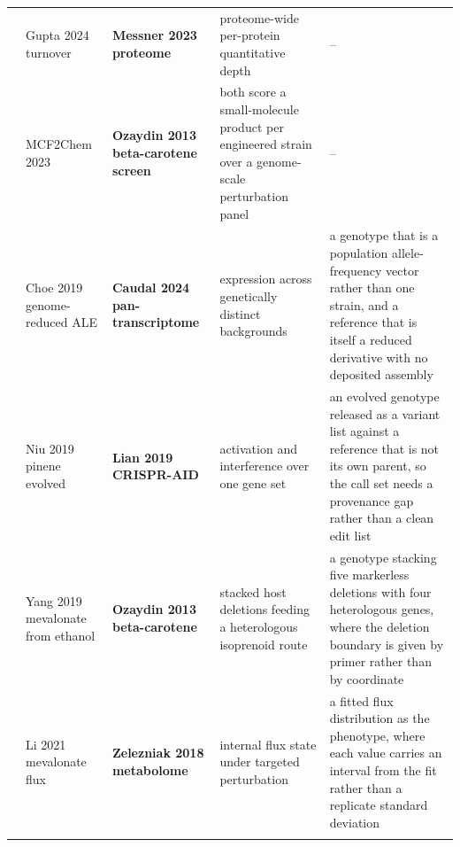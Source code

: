 \begin{landscape}
\begin{longtable}{@{}r@{\hspace{4pt}} L{40mm} L{40mm} L{74mm} L{74mm}@{}}
 & Gupta 2024 turnover  & \textbf{Messner 2023 proteome} & proteome-wide per-protein quantitative depth & -- \\
 & MCF2Chem 2023  & \textbf{Ozaydin 2013 beta-carotene screen} & both score a small-molecule product per engineered strain over a genome-scale perturbation panel & -- \\
 & Choe 2019 genome-reduced ALE  & \textbf{Caudal 2024 pan-transcriptome} & expression across genetically distinct backgrounds & a genotype that is a population allele-frequency vector rather than one strain, and a reference that is itself a reduced derivative with no deposited assembly \\
 & Niu 2019 pinene evolved  & \textbf{Lian 2019 CRISPR-AID} & activation and interference over one gene set & an evolved genotype released as a variant list against a reference that is not its own parent, so the call set needs a provenance gap rather than a clean edit list \\
 & Yang 2019 mevalonate from ethanol  & \textbf{Ozaydin 2013 beta-carotene} & stacked host deletions feeding a heterologous isoprenoid route & a genotype stacking five markerless deletions with four heterologous genes, where the deletion boundary is given by primer rather than by coordinate \\
 & Li 2021 mevalonate flux  & \textbf{Zelezniak 2018 metabolome} & internal flux state under targeted perturbation & a fitted flux distribution as the phenotype, where each value carries an interval from the fit rather than a replicate standard deviation \\
\addlinespace[5pt]
\end{longtable}
\endgroup
\end{landscape}
